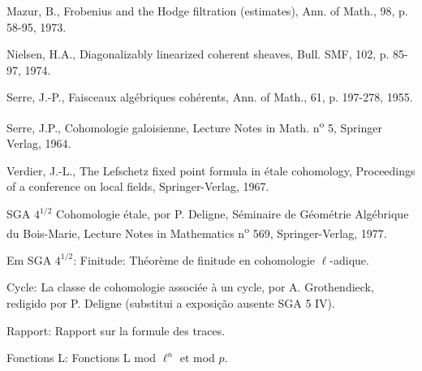 \begin{enumerate}[label={[\arabic*]},leftmargin=3.5em]
\item Mazur, B., Frobenius and the Hodge filtration (estimates), Ann. of Math., 98, p. 58-95, 1973.
\item Nielsen, H.A., Diagonalizably linearized coherent sheaves, Bull. SMF, 102, p. 85-97, 1974.
\item Serre, J.-P., Faisceaux algébriques cohérents, Ann. of Math., 61, p. 197-278, 1955.
\item Serre, J.P., Cohomologie galoisienne, Lecture Notes in Math. n\textsuperscript{o} 5, Springer Verlag, 1964.
\item Verdier, J.-L., The Lefschetz fixed point formula in étale cohomology, Proceedings of a conference on local fields, Springer-Verlag, 1967.
\end{enumerate}

SGA $4^{1/2}$ Cohomologie étale, por P. Deligne, Séminaire de Géométrie Algébrique du Bois-Marie, Lecture Notes in Mathematics n\textsuperscript{o} 569, Springer-Verlag, 1977.

Em SGA $4^{1/2}$: Finitude: Théorème de finitude en cohomologie $\ell$-adique.

Cycle: La classe de cohomologie associée à un cycle, por A. Grothendieck, redigido por P. Deligne (substitui a exposição ausente SGA 5 IV).

Rapport: Rapport sur la formule des traces.

Fonctions L: Fonctions L mod $\ell^n$ et mod $p$.

\clearpage
